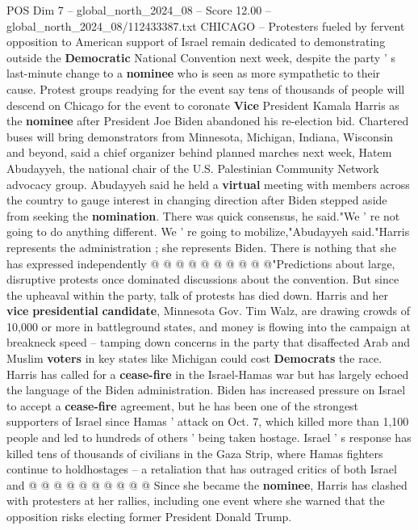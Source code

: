 \begin{textsample}{POS Dim 7 – global\_north\_2024\_08 – Score 12.00 – global\_north\_2024\_08/112433387.txt}  \label{ex:f7_pos_020}
CHICAGO -- Protesters fueled by fervent opposition to American support of Israel remain dedicated to demonstrating outside the \textbf{Democratic} National Convention next week, despite the party ' s last-minute change to a \textbf{nominee} who is seen as more sympathetic to their cause.
Protest groups readying for the event say tens of thousands of people will descend on Chicago for the event to coronate \textbf{Vice} President Kamala Harris as the \textbf{nominee} after President Joe Biden abandoned his re-election bid.
Chartered buses will bring demonstrators from Minnesota, Michigan, Indiana, Wisconsin and beyond, said a chief organizer behind planned marches next week, Hatem Abudayyeh, the national chair of the U.S.
Palestinian Community Network advocacy group.
Abudayyeh said he held a \textbf{virtual} meeting with members across the country to gauge interest in changing direction after Biden stepped aside from seeking the \textbf{nomination}.
There was quick consensus, he said."We ' re not going to do anything different.
We ' re going to mobilize,"Abudayyeh said."Harris represents the administration ; she represents Biden.
There is nothing that she has expressed independently @ @ @ @ @ @ @ @ @ @"Predictions about large, disruptive protests once dominated discussions about the convention.
But since the upheaval within the party, talk of protests has died down.
Harris and her \textbf{vice} \textbf{presidential} \textbf{candidate}, Minnesota Gov.
Tim Walz, are drawing crowds of 10,000 or more in battleground states, and money is flowing into the campaign at breakneck speed -- tamping down concerns in the party that disaffected Arab and Muslim \textbf{voters} in key states like Michigan could cost \textbf{Democrats} the race.
Harris has called for a \textbf{cease-fire} in the Israel-Hamas war but has largely echoed the language of the Biden administration.
Biden has increased pressure on Israel to accept a \textbf{cease-fire} agreement, but he has been one of the strongest supporters of Israel since Hamas ' attack on Oct. 7, which killed more than 1,100 people and led to hundreds of others ' being taken hostage.
Israel ' s response has killed tens of thousands of civilians in the Gaza Strip, where Hamas fighters continue to holdhostages -- a retaliation that has outraged critics of both Israel and @ @ @ @ @ @ @ @ @ @ Since she became the \textbf{nominee}, Harris has clashed with protesters at her rallies, including one event where she warned that the opposition risks electing former President Donald Trump.

\end{textsample}

